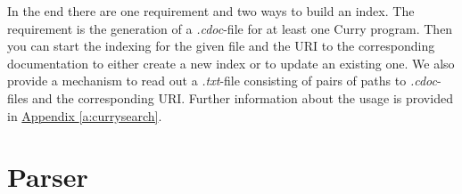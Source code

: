 \documentclass[%
	pdftex,%
	a4paper,%
	oneside,%
	chapterprefix,%
	headsepline,%
	12pt%
]{scrbook}
\begin{document}
In the end there are one requirement and two ways to build an index. %
The requirement is the generation of a \emph{.cdoc}-file for at least
one Curry program. %
Then you can start the indexing for the given file and the URI to the
corresponding documentation to either create a new index or to update
an existing one. %
We also provide a mechanism to read out a \emph{.txt}-file consisting
of pairs of paths to \emph{.cdoc}-files and the corresponding URI. %
Further information about the usage is provided in
\hyperref[a:curryindexer]{Appendix \ref{a:currysearch}}.






 
\section{Parser}\label{implementation:parser}

\end{document}
